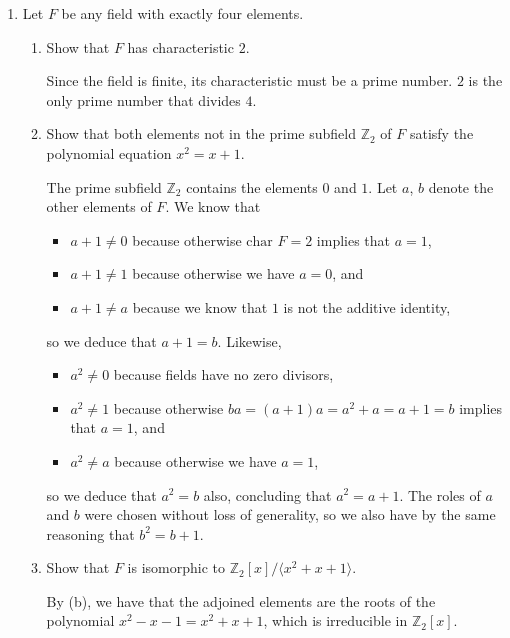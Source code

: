 \documentclass[12pt]{article}
\newcommand{\ZZ}{\mathbb{Z}}
\begin{document}
\begin{enumerate}
    \item Let $F$ be any field with exactly four elements.
    \begin{enumerate}
        \item Show that $F$ has characteristic $2$. \par
            Since the field is finite, its characteristic must be a prime number. $2$ is the only prime number that divides $4$.

        \item Show that both elements not in the prime subfield $\ZZ_2$ of $F$ satisfy the polynomial equation $x^2=x+1$. \par
            The prime subfield $\ZZ_2$ contains the elements $0$ and $1$. Let $a$, $b$ denote the other elements of $F$. We know that
            \begin{itemize}
                \item
                    $a + 1 \neq 0$ because otherwise $\text{char }F = 2$ implies that $a = 1$,
                \item
                    $a + 1 \neq 1$ because otherwise we have $a = 0$, and
                \item
                    $a + 1 \neq a$ because we know that $1$ is not the additive identity,
            \end{itemize}
            so we deduce that $a + 1 = b$. Likewise,
            \begin{itemize}
                \item
                    $a^2 \neq 0$ because fields have no zero divisors,
                \item
                    $a^2 \neq 1$ because otherwise $ba = (a + 1)a = a^2 + a = a + 1 = b$ implies that $a = 1$, and
                \item
                    $a^2 \neq a$ because otherwise we have $a = 1$,
            \end{itemize}
            so we deduce that $a^2 = b$ also, concluding that $a^2 = a + 1$. The roles of $a$ and $b$ were chosen without loss of generality, so we also have by the same reasoning that $b^2 = b + 1$.

        \item Show that $F$ is isomorphic to $\ZZ_2[x]/\langle x^2+x+1\rangle$. \par
            By (b), we have that the adjoined elements are the roots of the polynomial $x^2 - x - 1 = x^2 + x + 1$, which is irreducible in $\ZZ_2[x]$.
    \end{enumerate}


\end{enumerate}
\end{document}
